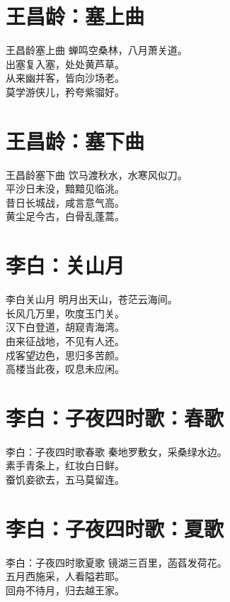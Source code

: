\documentclass[12pt,oneside,a5paper]{book}
\begin{document}
\chapter{王昌龄：塞上曲}
\begin{poemzh}{王昌龄}{塞上曲}
蝉鸣空桑林，八月萧关道。\\
出塞复入塞，处处黄芦草。\\
从来幽并客，皆向沙场老。\\
莫学游侠儿，矜夸紫骝好。\\ 
\end{poemzh}


\chapter{王昌龄：塞下曲}
\begin{poemzh}{王昌龄}{塞下曲}
饮马渡秋水，水寒风似刀。\\
平沙日未没，黯黯见临洮。\\
昔日长城战，咸言意气高。\\
黄尘足今古，白骨乱蓬蒿。\\ 
\end{poemzh}

\chapter{李白：关山月}
\begin{poemzh}{李白}{关山月}
明月出天山，苍茫云海间。\\
长风几万里，吹度玉门关。\\
汉下白登道，胡窥青海湾。\\
由来征战地，不见有人还。\\
戍客望边色，思归多苦颜。\\
高楼当此夜，叹息未应闲。\\ 
\end{poemzh}

\chapter{李白：子夜四时歌：春歌}
\begin{poemzh}{李白：子夜四时歌}{春歌}
秦地罗敷女，采桑绿水边。\\
素手青条上，红妆白日鲜。\\
蚕饥妾欲去，五马莫留连。\\ 
\end{poemzh}

\chapter{李白：子夜四时歌：夏歌}
\begin{poemzh}{李白：子夜四时歌}{夏歌}
镜湖三百里，菡萏发荷花。\\
五月西施采，人看隘若耶。\\
回舟不待月，归去越王家。\\ 
\end{poemzh}
\end{document}
